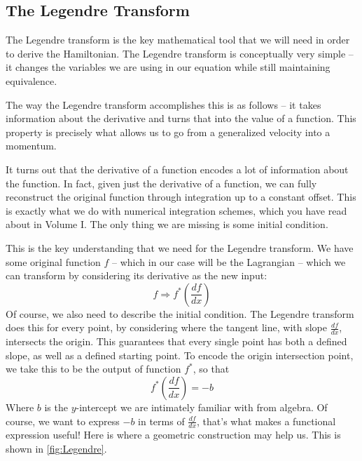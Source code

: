 \subsection{The Legendre Transform}
The Legendre transform is the key mathematical tool that we will need in order to derive the \gls{Hamiltonian}. The Legendre transform is conceptually very simple -- it changes the variables we are using in our equation while still maintaining equivalence.

The way the Legendre transform accomplishes this is as follows -- it takes information about the derivative and turns that into the value of a function. This property is precisely what allows us to go from a generalized velocity into a momentum.

It turns out that the derivative of a function encodes a lot of information about the function. In fact, given just the derivative of a function, we can fully reconstruct the original function through integration up to a constant offset. This is exactly what we do with numerical integration schemes, which you have read about in Volume I. The only thing we are missing is some initial condition.

This is the key understanding that we need for the Legendre transform. We have some original function $f$ -- which in our case will be the \gls{Lagrangian} -- which we can transform by considering its derivative as the new input:
$$f\Rightarrow f^*\left(\frac{df}{dx}\right)$$
Of course, we also need to describe the initial condition. The Legendre transform does this for every point, by considering where the tangent line, with slope $\frac{df}{dx}$, intersects the origin. This guarantees that every single point has both a defined slope, as well as a defined starting point. To encode the origin intersection point, we take this to be the output of function $f^*$, so that 
$$f^*\left(\frac{df}{dx}\right)=-b$$
Where $b$ is the $y$-intercept we are intimately familiar with from algebra. Of course, we want to express $-b$ in terms of $\frac{df}{dx}$, that's what makes a functional expression useful! Here is where a geometric construction may help us. This is shown in \autoref{fig:Legendre}.

